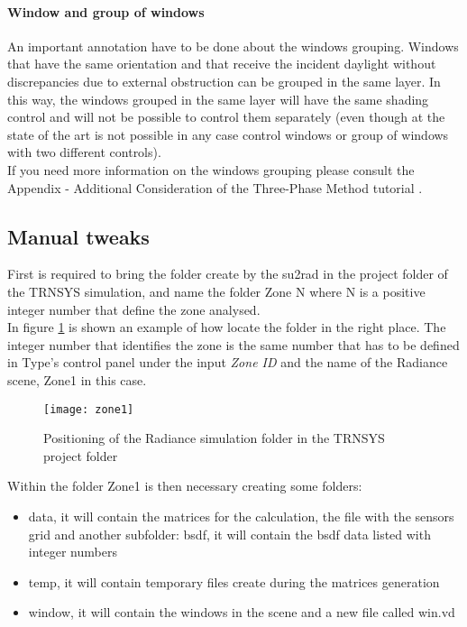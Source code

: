 \paragraph{Window and group of windows} 
An important annotation have to be done about the windows grouping. Windows that have the same orientation and that receive the incident daylight without discrepancies due to external obstruction can be grouped in the same layer. In this way, the windows grouped in the same layer will have the same shading control and will not be possible to control them separately (even though at the state of the art is not possible in any case control windows or group of windows with two different controls).  \\
If you need more information on the windows grouping please consult the Appendix - Additional Consideration of the Three-Phase Method tutorial \cite{3ph_tut}.


\subsection{Manual tweaks}
First is required to bring the folder create by the su2rad in the project folder of the TRNSYS simulation, and name the folder Zone{\color{red} N} where {\color{red} N} is a positive integer number that define the zone analysed.\\
In figure \ref{img4:zone1} is shown an example of how locate the folder in the right place. The integer number that identifies the zone is the same number that has to be defined in Type's control panel under the input \textit{Zone ID} and the name of the Radiance scene, Zone1 in this case.
\begin{figure}[h]
\centering
\texttt{[image: zone1]}
\caption{\label{img4:zone1} Positioning of the Radiance simulation folder in the TRNSYS project folder}
\end{figure}

Within the folder Zone1 is then necessary creating some folders: 
\begin{itemize}
\renewcommand{\labelitemi}{\tiny$\blacksquare$}
\item {\color{blue} data}, it will contain the matrices for the calculation, the file with the sensors grid and another subfolder:
\subitem{\tiny$\blacksquare$} {\color{blue} bsdf}, it will contain the bsdf data listed with integer numbers
\item {\color{blue} temp}, it will contain temporary files create during the matrices generation
\item {\color{blue} window}, it will contain the windows in the scene and a new file called win.vd
\end{itemize}

